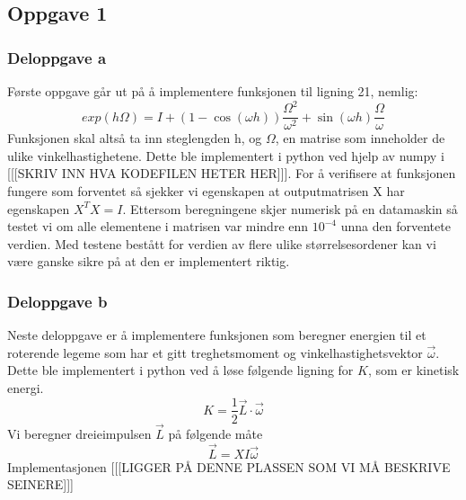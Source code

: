 \subsection{Oppgave 1}
\subsubsection{Deloppgave a}
Første oppgave går ut på å implementere funksjonen til ligning 21, nemlig: 
\begin{equation}
    exp(h\Omega) = \textit{I} + (1 - \cos(\omega h))\frac{\Omega^2}{\omega^2}+\sin(\omega h)\frac{\Omega}{\omega}
\end{equation}
Funksjonen skal altså ta inn steglengden h, og $\Omega$, en matrise som inneholder de ulike vinkelhastighetene. Dette ble implementert i python ved hjelp av numpy i [[[SKRIV INN HVA KODEFILEN HETER HER]]]. For å verifisere at funksjonen fungere som forventet så sjekker vi egenskapen at outputmatrisen X har egenskapen $X^T X = I$. Ettersom beregningene skjer numerisk på en datamaskin så testet vi om alle elementene i matrisen var mindre enn $10^{-4}$ unna den forventete verdien. Med testene bestått for verdien av flere ulike størrelsesordener kan vi være ganske sikre på at den er implementert riktig.
\subsubsection{Deloppgave b}
Neste deloppgave er å implementere funksjonen som beregner energien til et roterende legeme som har et gitt treghetsmoment og vinkelhastighetsvektor $\Vec{\omega}$. Dette ble implementert i python ved å løse følgende ligning for $K$, som er kinetisk energi.
\begin{equation}
    \textit{K} = \frac{1}{2}\vec{\textit{L}}\cdot \vec{\omega}
\end{equation}
Vi beregner dreieimpulsen $\vec{L}$ på følgende måte
\begin{equation}
\label{eq:dreieimpuls}
    \vec{L}=XI\vec{\omega}
\end{equation}
Implementasjonen [[[LIGGER PÅ DENNE PLASSEN SOM VI MÅ BESKRIVE SEINERE]]]
